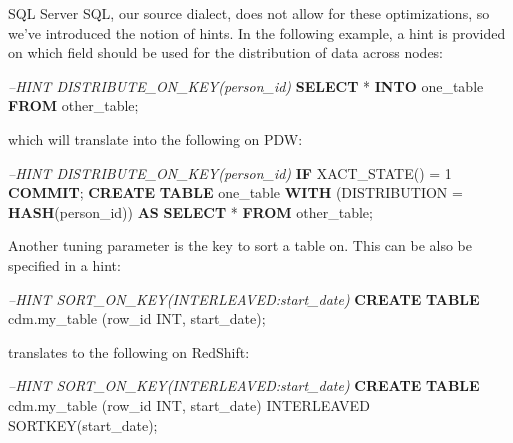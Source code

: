 \documentclass[]{article}
\newenvironment{Shaded}{\begin{snugshade}}{\end{snugshade}}
\newcommand{\CommentTok}[1]{\textcolor[rgb]{0.56,0.35,0.01}{\textit{#1}}}
\newcommand{\DataTypeTok}[1]{\textcolor[rgb]{0.13,0.29,0.53}{#1}}
\newcommand{\DecValTok}[1]{\textcolor[rgb]{0.00,0.00,0.81}{#1}}
\newcommand{\KeywordTok}[1]{\textcolor[rgb]{0.13,0.29,0.53}{\textbf{#1}}}
\newcommand{\NormalTok}[1]{#1}
\begin{document}
SQL Server SQL, our source dialect, does not allow for these
optimizations, so we've introduced the notion of hints. In the following
example, a hint is provided on which field should be used for the
distribution of data across nodes:

\begin{Shaded}
\begin{Highlighting}[]
\CommentTok{--HINT DISTRIBUTE_ON_KEY(person_id)}
\KeywordTok{SELECT}\NormalTok{ * }\KeywordTok{INTO}\NormalTok{ one_table }\KeywordTok{FROM}\NormalTok{ other_table;}
\end{Highlighting}
\end{Shaded}

which will translate into the following on PDW:

\begin{Shaded}
\begin{Highlighting}[]
\CommentTok{--HINT DISTRIBUTE_ON_KEY(person_id)}
\KeywordTok{IF}\NormalTok{ XACT_STATE() = }\DecValTok{1} \KeywordTok{COMMIT}\NormalTok{; }
\KeywordTok{CREATE} \KeywordTok{TABLE}\NormalTok{ one_table }\KeywordTok{WITH}\NormalTok{ (DISTRIBUTION = }\KeywordTok{HASH}\NormalTok{(person_id)) }\KeywordTok{AS}
\KeywordTok{SELECT}\NormalTok{ * }\KeywordTok{FROM}\NormalTok{ other_table;}
\end{Highlighting}
\end{Shaded}

Another tuning parameter is the key to sort a table on. This can be also
be specified in a hint:

\begin{Shaded}
\begin{Highlighting}[]
\CommentTok{--HINT SORT_ON_KEY(INTERLEAVED:start_date)}
\KeywordTok{CREATE} \KeywordTok{TABLE}\NormalTok{ cdm.my_table (row_id }\DataTypeTok{INT}\NormalTok{, start_date);}
\end{Highlighting}
\end{Shaded}

translates to the following on RedShift:

\begin{Shaded}
\begin{Highlighting}[]
\CommentTok{--HINT SORT_ON_KEY(INTERLEAVED:start_date)}
\KeywordTok{CREATE} \KeywordTok{TABLE}\NormalTok{ cdm.my_table (row_id }\DataTypeTok{INT}\NormalTok{, start_date)}
\NormalTok{INTERLEAVED SORTKEY(start_date);}
\end{Highlighting}
\end{Shaded}
\end{document}
